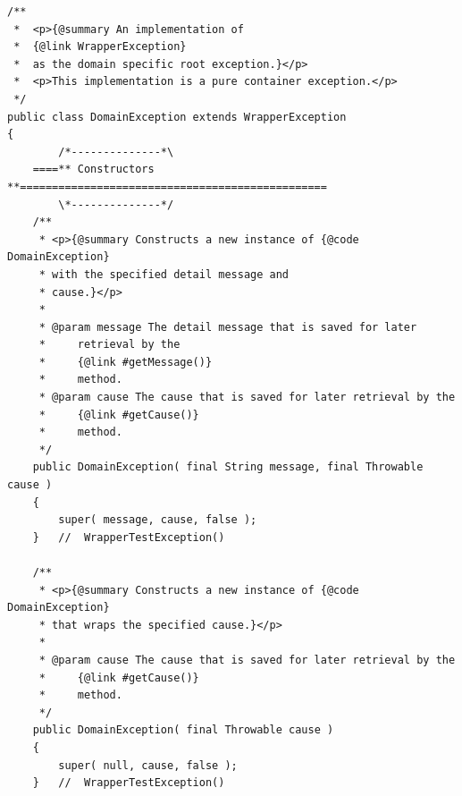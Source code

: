 \begin{lstlisting}
/**
 *  <p>{@summary An implementation of
 *  {@link WrapperException}
 *  as the domain specific root exception.}</p>
 *  <p>This implementation is a pure container exception.</p>
 */
public class DomainException extends WrapperException
{
        /*--------------*\
    ====** Constructors **================================================
        \*--------------*/
    /**
     * <p>{@summary Constructs a new instance of {@code DomainException}
     * with the specified detail message and
     * cause.}</p>
     *
     * @param message The detail message that is saved for later
     *     retrieval by the
     *     {@link #getMessage()}
     *     method.
     * @param cause The cause that is saved for later retrieval by the
     *     {@link #getCause()}
     *     method.
     */
    public DomainException( final String message, final Throwable cause ) 
    { 
        super( message, cause, false ); 
    }   //  WrapperTestException()

    /**
     * <p>{@summary Constructs a new instance of {@code DomainException}
     * that wraps the specified cause.}</p>
     *
     * @param cause The cause that is saved for later retrieval by the
     *     {@link #getCause()}
     *     method.
     */
    public DomainException( final Throwable cause ) 
    { 
        super( null, cause, false );
    }   //  WrapperTestException()


\end{lstlisting}
